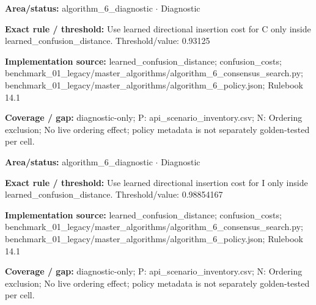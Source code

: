 \begin{tcolorbox}[enhanced,breakable,colback=white,colframe=Muted!45,boxrule=0.45pt,arc=1.5pt,left=6pt,right=6pt,top=5pt,bottom=5pt,title={\texttt{A6-LEARNED-INSERTION-C}},title after break={\texttt{A6-LEARNED-INSERTION-C}\ (continued)},fonttitle=\headingfont\bfseries\color{Navy},coltitle=Navy]
\textbf{Area/status:} algorithm\_\allowbreak{}6\_\allowbreak{}diagnostic $\boldsymbol{\cdot}$ Diagnostic\par
\smallskip
\textbf{Exact rule / threshold:} Use learned directional insertion cost for C only inside learned\_\allowbreak{}confusion\_\allowbreak{}distance. Threshold/\allowbreak{}value: 0.93125\par
\smallskip
\textbf{Implementation source:} learned\_\allowbreak{}confusion\_\allowbreak{}distance; confusion\_\allowbreak{}costs; benchmark\_\allowbreak{}01\_\allowbreak{}legacy/\allowbreak{}master\_\allowbreak{}algorithms/\allowbreak{}algorithm\_\allowbreak{}6\_\allowbreak{}consensus\_\allowbreak{}search.py; benchmark\_\allowbreak{}01\_\allowbreak{}legacy/\allowbreak{}master\_\allowbreak{}algorithms/\allowbreak{}algorithm\_\allowbreak{}6\_\allowbreak{}policy.json; Rulebook 14.1\par
\smallskip
\textbf{Coverage / gap:} diagnostic-only; P: api\_\allowbreak{}scenario\_\allowbreak{}inventory.csv; N: Ordering exclusion; No live ordering effect; policy metadata is not separately golden-tested per cell.
\end{tcolorbox}
\begin{tcolorbox}[enhanced,breakable,colback=white,colframe=Muted!45,boxrule=0.45pt,arc=1.5pt,left=6pt,right=6pt,top=5pt,bottom=5pt,title={\texttt{A6-LEARNED-INSERTION-I}},title after break={\texttt{A6-LEARNED-INSERTION-I}\ (continued)},fonttitle=\headingfont\bfseries\color{Navy},coltitle=Navy]
\textbf{Area/status:} algorithm\_\allowbreak{}6\_\allowbreak{}diagnostic $\boldsymbol{\cdot}$ Diagnostic\par
\smallskip
\textbf{Exact rule / threshold:} Use learned directional insertion cost for I only inside learned\_\allowbreak{}confusion\_\allowbreak{}distance. Threshold/\allowbreak{}value: 0.98854167\par
\smallskip
\textbf{Implementation source:} learned\_\allowbreak{}confusion\_\allowbreak{}distance; confusion\_\allowbreak{}costs; benchmark\_\allowbreak{}01\_\allowbreak{}legacy/\allowbreak{}master\_\allowbreak{}algorithms/\allowbreak{}algorithm\_\allowbreak{}6\_\allowbreak{}consensus\_\allowbreak{}search.py; benchmark\_\allowbreak{}01\_\allowbreak{}legacy/\allowbreak{}master\_\allowbreak{}algorithms/\allowbreak{}algorithm\_\allowbreak{}6\_\allowbreak{}policy.json; Rulebook 14.1\par
\smallskip
\textbf{Coverage / gap:} diagnostic-only; P: api\_\allowbreak{}scenario\_\allowbreak{}inventory.csv; N: Ordering exclusion; No live ordering effect; policy metadata is not separately golden-tested per cell.
\end{tcolorbox}
